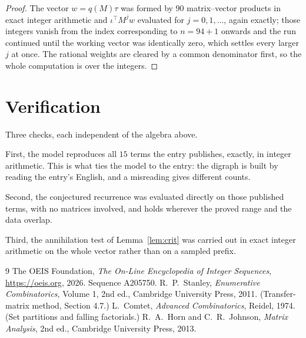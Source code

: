 \documentclass[11pt,a4paper]{article}
\theoremstyle{plain}
\theoremstyle{definition}
\begin{document}
\begin{proof}
The vector $w=q(M)\tau$ was formed by $90$ matrix--vector products in exact integer
arithmetic and $\iota^{\!\top}M^{j}w$ evaluated for $j=0,1,\dots$, again exactly; those
integers vanish from the index corresponding to $n=94+1$ onwards and the run continued
until the working vector was identically zero, which settles every larger $j$ at once. The
rational weights are cleared by a common denominator first, so the whole computation is over
the integers.
\end{proof}

\section{Verification}

Three checks, each independent of the algebra above.

First, the model reproduces all $15$ terms the entry publishes, exactly, in integer
arithmetic. This is what ties the model to the entry: the digraph is built by reading the
entry's English, and a misreading gives different counts.

Second, the conjectured recurrence was evaluated directly on those published terms, with no
matrices involved, and holds wherever the proved range and the data overlap.

Third, the annihilation test of Lemma~\ref{lem:crit} was carried out in exact integer
arithmetic on the whole vector rather than on a sampled prefix.

\begin{thebibliography}{9}
 The OEIS Foundation, \emph{The On-Line Encyclopedia of Integer
Sequences}, \url{https://oeis.org}, 2026. Sequence A205750.
 R.~P.~Stanley, \emph{Enumerative Combinatorics}, Volume 1, 2nd ed.,
Cambridge University Press, 2011. (Transfer-matrix method, Section 4.7.)
 L.~Comtet, \emph{Advanced Combinatorics}, Reidel, 1974. (Set partitions
and falling factorials.)
 R.~A.~Horn and C.~R.~Johnson, \emph{Matrix Analysis}, 2nd ed., Cambridge
University Press, 2013.
\end{thebibliography}
\end{document}

